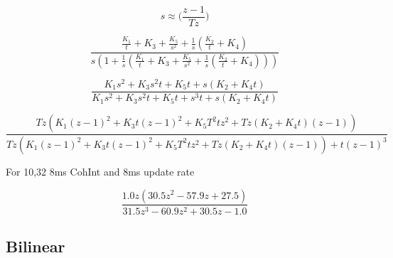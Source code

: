 \begin{equation}
s \approx \Big(\frac{z-1}{Tz}\Big)
\end{equation}

\begin{comment}
\begin{equation}
 H(s) = \frac{s^2(K1) + s(K2) + K3}
 {s^3+ s^2(K1)+ s(K2) + K3}
\end{equation}

\begin{equation}
 H(s) = \frac{\Big(\frac{z-1}{Tz}\Big)^2(K1) + \Big(\frac{z-1}{Tz}\Big)(K2) + K3}{\Big(\frac{z-1}{Tz}\Big)^3+ \Big(\frac{z-1}{Tz}\Big)^2(K1)+ \Big(\frac{z-1}{Tz}\Big)(K2) + K3}
\end{equation}
\end{comment}

\begin{equation}
\frac{\frac{K_{1}}{t} + K_{3} + \frac{K_{5}}{s^{2}} + \frac{1}{s} \left(\frac{K_{2}}{t} + K_{4}\right)}{s \left(1 + \frac{1}{s} \left(\frac{K_{1}}{t} + K_{3} + \frac{K_{5}}{s^{2}} + \frac{1}{s} \left(\frac{K_{2}}{t} + K_{4}\right)\right)\right)}
\end{equation}

\begin{equation}
\frac{K_{1} s^{2} + K_{3} s^{2} t + K_{5} t + s \left(K_{2} + K_{4} t\right)}{K_{1} s^{2} + K_{3} s^{2} t + K_{5} t + s^{3} t + s \left(K_{2} + K_{4} t\right)}
\end{equation}

\begin{equation}
\frac{T z \left(K_{1} \left(z - 1\right)^{2} + K_{3} t \left(z - 1\right)^{2} + K_{5} T^{2} t z^{2} + T z \left(K_{2} + K_{4} t\right) \left(z - 1\right)\right)}{T z \left(K_{1} \left(z - 1\right)^{2} + K_{3} t \left(z - 1\right)^{2} + K_{5} T^{2} t z^{2} + T z \left(K_{2} + K_{4} t\right) \left(z - 1\right)\right) + t \left(z - 1\right)^{3}}
\end{equation}

For 10,32 8ms CohInt and 8ms update rate

\begin{equation}
\frac{1.0 z \left(30.5 z^{2} - 57.9 z + 27.5\right)}{31.5 z^{3} - 60.9 z^{2} + 30.5 z - 1.0}
\end{equation}


\cite{arashBook}
\clearpage


\subsection{Bilinear}

